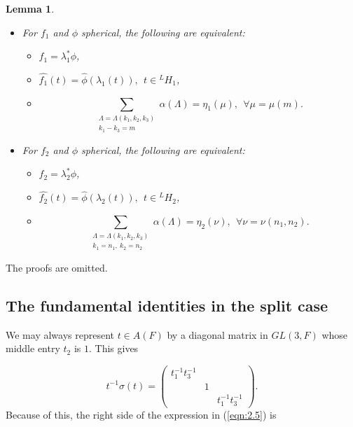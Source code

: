 \documentclass[12pt,letterpaper]{article}
\newtheorem{lemma}[theorem]{Lemma}
\begin{document}
\begin{lemma}
\label{lemma:2.11}

\begin{itemize}
\item[(a)] 
For $f_1$ and $\phi$ spherical, the following are equivalent:

\begin{itemize}
\item[(i)] 
$f_1=\lambda_1^*\phi$,

\item[(ii)] 
$\hat{f_1}(t) = \hat{\phi}(\lambda_1(t)),\ \ t\in {^{L}H_1}$,

\item[(iii)]

\[
\sum_{\substack{\Lambda = \Lambda (k_1,k_2,k_3)\\k_1-k_3=m}} 
\alpha (\Lambda )
=\eta_1 (\mu ),\ \ \forall \mu = \mu (m).
\]
\end{itemize}
\item[(b)] 
For $f_2$ and $\phi$ spherical, the following are equivalent:

\begin{itemize}
\item[(i)] 
$f_2=\lambda_2^*\phi$,

\item[(ii)]
$\hat{f_2}(t) = \hat{\phi}(\lambda_2(t)),\ \ t\in {^{L}H_2}$,

\item[(iii)]

\[
\sum_{\substack{\Lambda = \Lambda (k_1,k_2,k_3)\\k_1=n_1,\ k_2=n_2}}
\alpha (\Lambda )
=\eta_2 (\nu ),\ \ \forall \nu = \nu (n_1,n_2).
\]
\end{itemize}
\end{itemize}
\end{lemma}
 
The proofs are omitted.

\subsection{The fundamental identities in the split case}
\label{sec:2.4}

We may always
represent $t\in A(F)$ by a diagonal matrix in $GL(3,F)$ whose middle
entry $t_2$ is $1$. This gives

\[
t^{-1}\sigma (t)
=
\left( 
\begin{array}{ccc} 
t_1^{-1}t_3^{-1}&\ &\ \\
\ &1&\ \\
\ &\ &t_1^{-1}t_3^{-1}
\end{array} 
\right) .
\]
Because of this, the right side of the expression in (\ref{eqn:2.5}) is
\end{document}
